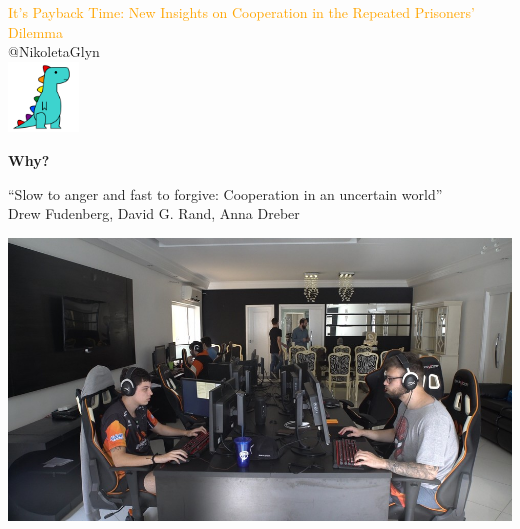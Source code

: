 \documentclass{beamer}
\begin{document}
\begin{frame}
    \begin{center}
        \Large{\textcolor{orange}{It's Payback Time: New Insights on Cooperation in the Repeated Prisoners' Dilemma}} \\
    
        \vspace{1cm}
        \normalsize{@NikoletaGlyn} \\
        \vspace{.5cm}
        \includegraphics[width=0.14\textwidth]{static/dyno.png}

    \end{center}
\end{frame}

\begin{frame}
    \begin{center}
        \LARGE{\textbf{Why?}}
    \end{center}
\end{frame}

\begin{frame}
    \begin{center}
        \LARGE{``Slow to anger and fast to forgive: Cooperation in an uncertain world''} \\ \vspace{.5cm}
        \normalsize{Drew Fudenberg, David G. Rand, Anna Dreber}
    \end{center}
\end{frame}

\begin{frame}
    \centering
    \includegraphics[width=.85\textwidth]{static/experiment}
\end{frame}
\end{document}
